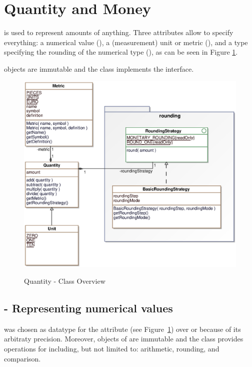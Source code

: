 \section{Quantity and Money}
\label{sec:quantity}
 is used to represent amounts of anything.
Three attributes allow  to specify everything: a numerical value (), a (measurement) unit or metric (), and a type specifying the rounding of the numerical type (), as can be seen in Figure \ref{quantity_overview}.

 objects are immutable and the class implements the  interface.

\begin{figure}[ht]
	\centering
  \includegraphics[width=1.0\textwidth]{images/Quantity_Overview.eps}
	\label{quantity_overview}
	\caption{Quantity - Class Overview}
\end{figure}

\subsection{ - Representing numerical values}
 was chosen as datatype for the  attribute (see Figure~\ref{quantity_overview}) over  or  because of its arbitraty precision.
Moreover, objects of  are immutable and the  class provides operations for including, but not limited to: arithmetic, rounding, and comparison.

